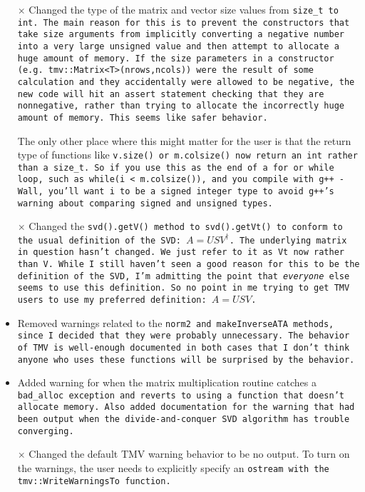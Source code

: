 \begin{itemize}
\item[$\times$]
Changed the type of the matrix and vector size values from \tt{size\_t} to \tt{int}.  The main reason for this is to prevent the constructors that take size arguments from implicitly converting a negative number into a very large unsigned value and then attempt to allocate a huge amount of memory.  If the size parameters in a constructor (e.g. \tt{tmv::Matrix<T>(nrows,ncols)}) were the result of some calculation and they accidentally were allowed to be negative, the new code will hit an assert statement checking that they are nonnegative, rather than trying to allocate the incorrectly huge amount of memory.  This seems like safer behavior.

The only other place where this might matter for the user is that the return type of functions like \tt{v.size()} or \tt{m.colsize()} now return an \tt{int} rather than a \tt{size\_t}.  So if you use this as the end of a \tt{for} or \tt{while} loop, such as \tt{while(i < m.colsize())}, and you compile with \tt{g++ -Wall}, you'll want \tt{i} to be a signed integer type to avoid \tt{g++}'s warning about comparing signed and unsigned types.

\item[$\times$]
Changed the \tt{svd().getV()} method to \tt{svd().getVt()} to conform to the
usual definition of the SVD: $A = U S V^\dagger$.  The underlying matrix
in question hasn't changed.  We just refer to it as \tt{Vt} now rather than
\tt{V}.  While I still haven't seen a good reason for this to be the 
definition of the SVD, I'm admitting the point that {\em everyone} else
seems to use this definition.  So no point in me trying to get TMV users
to use my preferred definition: $A = U S V$.

\item
Removed warnings related to the \tt{norm2} and \tt{makeInverseATA} methods, since I decided that they were probably unnecessary.  The behavior of TMV is well-enough documented in both cases that I don't think anyone who uses these functions will be surprised by the behavior.

\item 
Added warning for when the matrix multiplication routine catches a \tt{bad\_alloc} exception and reverts to using a function that doesn't allocate memory.  Also added documentation for the warning that had been output when the divide-and-conquer SVD algorithm has trouble converging.

\item[$\times$]
Changed the default TMV warning behavior to be no output.  To turn on the warnings, the user needs to explicitly specify an \tt{ostream} with the \tt{tmv::WriteWarningsTo} function.


\end{itemize}
